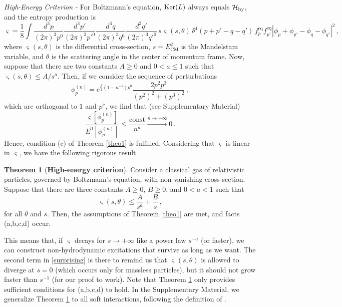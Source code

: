 \documentclass[a4paper, amsfonts, amssymb, amsmath, reprint, showkeys, nofootinbib, twoside, onecolumn,notitlepage,,longbibliography]{revtex4-2}
\theoremstyle{definition}
\theoremstyle{theorem}
\newtheorem{theorem}{Theorem}
\theoremstyle{corollary}
\begin{document}
\noindent \textit{High-Energy Criterion -} For Boltzmann's equation, $\textup{Ker}(L)$ always equals $\mathcal{H}_{\textup{hy}}$, and the entropy production is \cite{Groot1980RelativisticKT}
\begin{equation}\label{varsigma}
    \varsigma = \dfrac{1}{8} 
\int \dfrac{d^3p}{(2\pi)^3 p^0} \dfrac{d^3p'}{(2\pi)^3p'^0} \dfrac{d^3q}{(2\pi)^3q^0} \dfrac{d^3q'}{(2\pi)^3q'^0} \, s \upvarsigma(s,\theta) \, \delta^4 (p{+}p'{-}q{-}q') \, f^{\text{eq}}_{p} f^{\text{eq}}_{p'} |\phi_p+\phi_{p'}-\phi_q-\phi_{q'}|^2  \, ,
\end{equation}
where $\upvarsigma(s,\theta)$ is the differential cross-section, $s =E^2_{\text{CM}}$ is the Mandelstam variable, and $\theta$ is the scattering angle in the center of momentum frame. Now, suppose that there are two constants $A\geq 0$ and $0<a \leq 1$ such that $\upvarsigma(s,\theta) \leq A/s^a$. Then, if we consider the sequence of perturbations
\begin{equation}\label{sequenceiaziomain}
    \phi_p^{(n)}= e^{\frac{\beta}{2}(1-n^{-1})p^0} \dfrac{2p^2 p^3}{(p^2)^2{+}(p^3)^2} \, ,
\end{equation}
which are orthogonal to $1$ and $p^\nu$, we find that (see Supplementary Material)
\begin{equation}
    \dfrac{\varsigma[\phi_p^{(n)}]}{E^0[\phi_p^{(n)}]} \leq \dfrac{\text{const}}{n^a} \xrightarrow[]{n\rightarrow +\infty} 0 \, .
\end{equation}
Hence, condition (c) of Theorem \ref{theo1} is fulfilled. Considering that $\varsigma$ is linear in $\upvarsigma$, we 
have the following rigorous result.
\begin{theorem}[\textbf{High-energy criterion}]\label{theo2}
Consider a classical gas of relativistic particles, governed by Boltzmann's equation, with non-vanishing cross-section. Suppose that there are three constants $A\geq 0$, $B \geq 0$,  and $0<a< 1$ such that
\begin{equation}\label{surprising}
\upvarsigma(s,\theta) \leq \dfrac{A}{s^a} + \dfrac{B}{s} \, ,
\end{equation}
for all $\theta$ and $s$. Then, the assumptions of Theorem \ref{theo1} are met, and facts \textup{(a,b,c,d)} occur.
\end{theorem}
This means that, if $\upvarsigma$ decays for $s\rightarrow +\infty$ like a power law $s^{-a}$ (or faster), we can construct non-hydrodynamic excitations that survive as long as we want. The second term in \eqref{surprising} is there to remind us that $\upvarsigma(s,\theta)$ is allowed to diverge at $s= 0$ (which occurs only for massless particles), but it should not grow faster than $s^{-1}$ (for our proof to work). Note that Theorem \ref{theo2} only provides sufficient conditions for (a,b,c,d) to hold. In the Supplementary Material, we generalize Theorem \ref{theo2} to all soft interactions, following the definition of \cite{Dudynski1988}.
\end{document}
